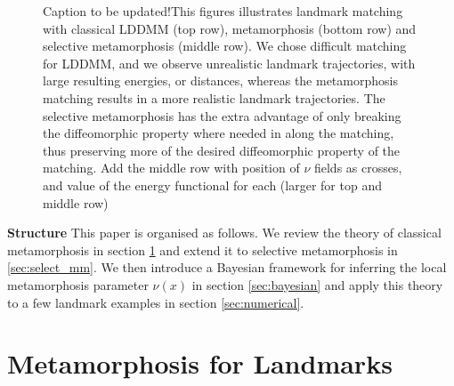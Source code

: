 \documentclass[runningheads]{llncs}
\begin{document}
\begin{figure}
\begin{minipage}{\textwidth}
    \caption{{\color{red} Caption to be updated!}This figures illustrates landmark matching with classical LDDMM
    (top row), metamorphosis (bottom row) and selective metamorphosis (middle
    row).  We chose difficult matching for LDDMM, and we observe unrealistic
    landmark trajectories, with large resulting energies, or distances, whereas
    the metamorphosis  matching results in a more realistic landmark
    trajectories.  The selective metamorphosis has the extra advantage of only
    breaking the diffeomorphic property where needed in along the matching, thus
    preserving more of the desired diffeomorphic property of the matching.
    {\color{red} Add the middle row with position of $\nu$ fields as crosses,
    and value of the energy functional for each (larger for top and middle
    row)}}
    \label{fig:mm_lddmm}
\end{minipage}
\end{figure}


{\bf Structure} This paper is organised as follows. We review the theory of
classical metamorphosis in section \ref{sec:bg} and extend it to selective
metamorphosis in \ref{sec:select_mm}.  We then introduce a Bayesian framework
for inferring the local metamorphosis parameter $\nu(x)$ in section
\ref{sec:bayesian} and apply this theory to a few landmark examples in section
\ref{sec:numerical}.

\section{Metamorphosis for Landmarks}\label{sec:bg}
\end{document}
